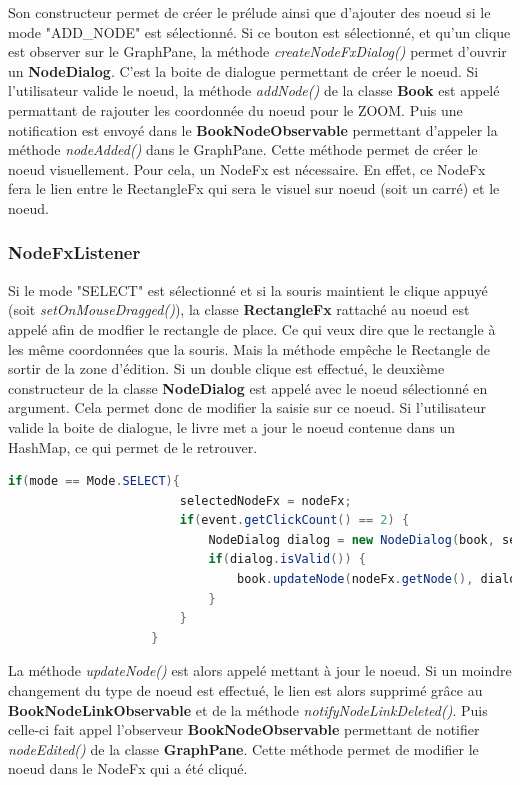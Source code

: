 			Son constructeur permet de créer le prélude ainsi que d'ajouter des noeud si le mode "ADD\_NODE" est sélectionné. Si ce bouton est sélectionné, et qu'un clique est observer sur le GraphPane, la méthode \textit{createNodeFxDialog()} permet d'ouvrir un \textbf{NodeDialog}. C'est la boite de dialogue permettant de créer le noeud. Si l'utilisateur valide le noeud, la méthode \textit{addNode()} de la classe \textbf{Book} est appelé permattant de rajouter les coordonnée du noeud pour le ZOOM. Puis une notification est envoyé dans le \textbf{BookNodeObservable} permettant d'appeler la méthode \textit{nodeAdded()} dans le GraphPane. Cette méthode permet de créer le noeud visuellement. Pour cela, un NodeFx est nécessaire. En effet, ce NodeFx fera le lien entre le RectangleFx qui sera le visuel sur noeud (soit un carré) et le noeud.

			\subsubsection{NodeFxListener}
				Si le mode "SELECT" est sélectionné et si la souris maintient le clique appuyé (soit \textit{setOnMouseDragged()}), la classe \textbf{RectangleFx} rattaché au noeud est appelé afin de modfier le rectangle de place. Ce qui veux dire que le rectangle à les même coordonnées que la souris. Mais la méthode empêche le Rectangle de sortir de la zone d'édition.
				Si un double clique est effectué, le deuxième constructeur de la classe \textbf{NodeDialog} est appelé avec le noeud sélectionné en argument. Cela permet donc de modifier la saisie sur ce noeud. Si l'utilisateur valide la boite de dialogue, le livre met a jour le noeud contenue dans un HashMap, ce qui permet de le retrouver.

				\begin{lstlisting}[gobble=12, language=java, caption=Classe NodeFxListener avec le mode SELECT]
					if(mode == Mode.SELECT){
						selectedNodeFx = nodeFx;
						if(event.getClickCount() == 2) {
							NodeDialog dialog = new NodeDialog(book, selectedNodeFx.getNode());
							if(dialog.isValid()) {
								book.updateNode(nodeFx.getNode(), dialog.getNode());
							}
						}
					}
				\end{lstlisting}

				La méthode \textit{updateNode()} est alors appelé mettant à jour le noeud. Si un moindre changement du type de noeud est effectué, le lien est alors supprimé grâce au \textbf{BookNodeLinkObservable} et de la méthode \textit{notifyNodeLinkDeleted()}.
				Puis celle-ci fait appel l'observeur \textbf{BookNodeObservable} permettant de notifier \textit{nodeEdited()} de la classe \textbf{GraphPane}. Cette méthode permet de modifier le noeud dans le NodeFx qui a été cliqué.


